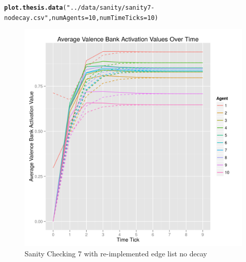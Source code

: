 \documentclass{article}\usepackage[]{graphicx}\usepackage[]{color}
\makeatletter
\def\maxwidth{ %
  \ifdim\Gin@nat@width>\linewidth
    \linewidth
  \else
    \Gin@nat@width
  \fi
}
\newcommand{\hlnum}[1]{\textcolor[rgb]{0.686,0.059,0.569}{#1}}%
\newcommand{\hlstr}[1]{\textcolor[rgb]{0.192,0.494,0.8}{#1}}%
\newcommand{\hlstd}[1]{\textcolor[rgb]{0.345,0.345,0.345}{#1}}%
\newcommand{\hlkwc}[1]{\textcolor[rgb]{0.333,0.667,0.333}{#1}}%
\newcommand{\hlkwd}[1]{\textcolor[rgb]{0.737,0.353,0.396}{\textbf{#1}}}%
\newenvironment{kframe}{%
 \def\at@end@of@kframe{}%
 \ifinner\ifhmode%
  \def\at@end@of@kframe{\end{minipage}}%
  \begin{minipage}{\columnwidth}%
 \fi\fi%
 \def\FrameCommand##1{\hskip\@totalleftmargin \hskip-\fboxsep
 \colorbox{shadecolor}{##1}\hskip-\fboxsep
     \hskip-\linewidth \hskip-\@totalleftmargin \hskip\columnwidth}%
 \MakeFramed {\advance\hsize-\width
   \@totalleftmargin\z@ \linewidth\hsize
   \@setminipage}}%
 {\par\unskip\endMakeFramed%
 \at@end@of@kframe}
\newenvironment{knitrout}{}{} %
\makeatother
\begin{document}
\begin{knitrout}
\color{fgcolor}\begin{kframe}
\begin{alltt}
\hlkwd{plot.thesis.data}\hlstd{(}\hlstr{"../data/sanity/sanity7-nodecay.csv"}\hlstd{,} \hlkwc{numAgents} \hlstd{=} \hlnum{10}\hlstd{,} \hlkwc{numTimeTicks} \hlstd{=} \hlnum{10}\hlstd{)}
\end{alltt}
\end{kframe}\begin{figure}[]

\includegraphics[width=\maxwidth]{figure/plot-sanity-7-nodecay} \caption[Sanity Checking 7 with re-implemented edge list no decay]{Sanity Checking 7 with re-implemented edge list no decay\label{fig:plot-sanity-7-nodecay}}
\end{figure}


\end{knitrout}


\newpage
\end{document}
